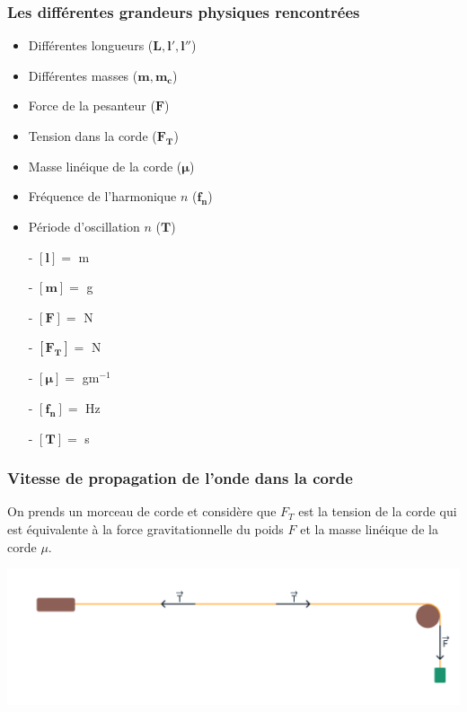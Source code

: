 \documentclass[12pt,a4paper]{article}
\begin{document}
    \subsubsection{Les différentes grandeurs physiques rencontrées}
    \begin{minipage}{0.6\linewidth}
        \begin{itemize}
            \item Différentes longueurs ($\bm{L, l', l''}$)
            \item Différentes masses ($\bm{m, m_c}$)
            \item Force de la pesanteur ($\bm{F}$)
            \item Tension dans la corde ($\bm{F_T}$)
            \item Masse linéique de la corde ($\bm{\mu}$)
            \item Fréquence de l'harmonique $n$ ($\bm{f_n}$)
            \item Période d'oscillation $n$ ($\bm{T}$)
        \end{itemize}
    \end{minipage}%
    \hfill
    \begin{minipage}{0.4\linewidth}
        \begin{itemize}
            \item[-] $\bm{[l]} =$ m
            \item[-] $\bm{[m]} =$ g
            \item[-] $\bm{[F]} =$ N
            \item[-] $\bm{[F_T]} =$ N
            \item[-] $\bm{[\mu]} =$ gm$^{-1}$
            \item[-] $\bm{[f_n]} =$ Hz
            \item[-] $\bm{[T]} =$ s
        \end{itemize}   
    \end{minipage}

    \subsubsection{Vitesse de propagation de l'onde dans la corde}
    On prends un morceau de corde et considère que $F_T$ est la tension de la corde qui est équivalente à la force gravitationnelle du poids $F$ et la masse linéique de la corde $\mu$.
    
    \includegraphics[width=.7\paperwidth]{images/schema_static_force.pdf}
\end{document}
